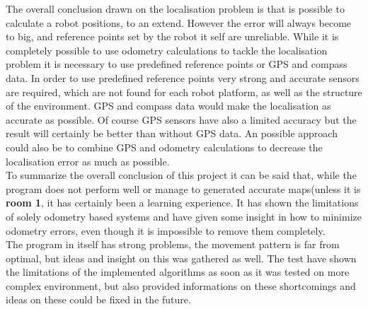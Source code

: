 The overall conclusion drawn on the localisation problem is that is possible to calculate a robot positions, to an extend. However the error will always become to big, and reference points set by the robot it self are unreliable.  While it is completely possible to use odometry calculations to tackle the localisation problem it is necessary to use predefined reference points or GPS and compass data. In order to use predefined reference points very strong and accurate sensors are required, which are not found for each robot platform, as well as the structure of the environment. GPS and compass data would make the localisation as accurate as possible. Of course GPS sensors have also a limited accuracy but the result will certainly be better than without GPS data. An possible approach could also be to combine GPS and odometry calculations to decrease the localisation error as much as possible. \\[3ex]

To summarize the overall conclusion of this project it can be said that, while the program does not perform well or manage to generated accurate maps(unless it is \textbf{room 1}, it has certainly been a learning experience. It has shown the limitations of solely odometry based systems and have given some insight in how to minimize odometry errors, even though it is impossible to remove them completely. \\
The program in itself has strong problems, the movement pattern is far from optimal, but ideas and insight on this was gathered as well. The test have shown the limitations of the implemented algorithms as soon as it was tested on more complex environment, but also provided informations on these shortcomings and ideas on these could be fixed in the future. 




